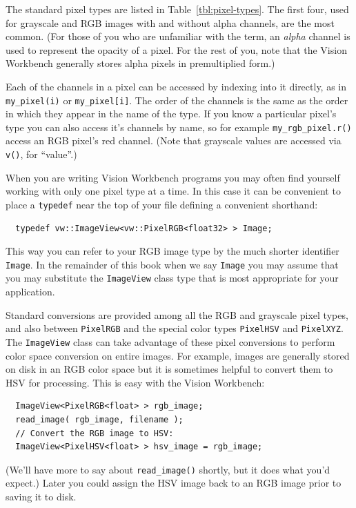 The standard pixel types are listed in Table~\ref{tbl:pixel-types}.
The first four, used for grayscale and RGB images with and without
alpha channels, are the most common.  (For those of you who are 
unfamiliar with the term, an {\it alpha} channel is used to represent 
the opacity of a pixel.  For the rest of you, note that the Vision 
Workbench generally stores alpha pixels in premultiplied form.)

Each of the channels in a pixel can be accessed by indexing into it
directly, as in \verb#my_pixel(i)# or \verb#my_pixel[i]#.  The order 
of the channels is the same as the order in which they appear in the 
name of the type.  If you know a particular pixel's type you can also 
access it's channels by name, so for example \verb#my_rgb_pixel.r()# 
access an RGB pixel's red channel.  (Note that grayscale values are 
accessed via \verb#v()#, for ``value''.)

When you are writing Vision Workbench programs you may often find 
yourself working with only one pixel type at a time.  In this case 
it can be convenient to place a \verb#typedef# near the top of your 
file defining a convenient shorthand:
\begin{verbatim}
  typedef vw::ImageView<vw::PixelRGB<float32> > Image;
\end{verbatim}
This way you can refer to your RGB image type by the much shorter
identifier \verb#Image#.  In the remainder of this book when we say
\verb#Image# you may assume that you may substitute the
\verb#ImageView# class type that is most appropriate for your
application.

Standard conversions are provided among all the RGB and grayscale pixel 
types, and also between \verb#PixelRGB# and the special color types 
\verb#PixelHSV# and \verb#PixelXYZ#.  The \verb#ImageView# class can 
take advantage of these pixel conversions to perform color space 
conversion on entire images.  For example, images are generally stored 
on disk in an RGB color space but it is sometimes helpful to convert 
them to HSV for processing.  This is easy with the Vision Workbench:
\begin{verbatim}
  ImageView<PixelRGB<float> > rgb_image;
  read_image( rgb_image, filename );
  // Convert the RGB image to HSV:
  ImageView<PixelHSV<float> > hsv_image = rgb_image;
\end{verbatim}
(We'll have more to say about \verb#read_image()# shortly, but it 
does what you'd expect.)  Later you could assign the HSV image back 
to an RGB image prior to saving it to disk.

